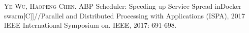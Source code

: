 
\begin{publications}{99}
    \item\textsc{Ye Wu, Haopeng Chen}. {ABP Scheduler: Speeding up Service Spread inDocker swarm}[C]]//Parallel and Distributed Processing with Applications (ISPA), 2017 IEEE International Symposium on. IEEE, 2017: 691-698.
\end{publications}
